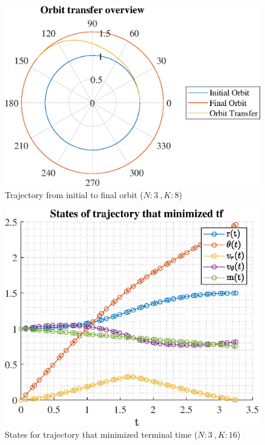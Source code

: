 \documentclass[]{article}
\begin{document}
	\begin{figure}
		\centering
		\includegraphics[scale=0.75]{orbit_N3_K8_C3_tf.eps}
		\caption{Trajectory from initial to final orbit (\(N:3\ , K:8\))}
		\label{fig:orbit_N3_K8_C3_tf}
	\end{figure}
	\begin{figure}
		\centering
		\includegraphics[scale=0.75]{states_N3_K16_C3_tf.eps}
		\caption{States for trajectory that minimized terminal time (\(N:3\ , K:16\))}
		\label{fig:states_N3_K16_C3_tf}
	\end{figure}
\end{document}
